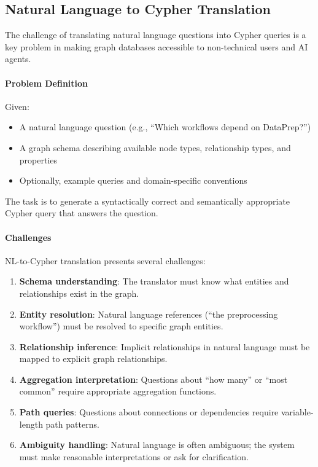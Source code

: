 \subsection{Natural Language to Cypher Translation}

The challenge of translating natural language questions into Cypher queries is a key problem in making graph databases accessible to non-technical users and AI agents.

\paragraph{Problem Definition}

Given:
\begin{itemize}
    \item A natural language question (e.g., ``Which workflows depend on DataPrep?'')
    \item A graph schema describing available node types, relationship types, and properties
    \item Optionally, example queries and domain-specific conventions
\end{itemize}

The task is to generate a syntactically correct and semantically appropriate Cypher query that answers the question.

\paragraph{Challenges}

NL-to-Cypher translation presents several challenges:

\begin{enumerate}
    \item \textbf{Schema understanding}: The translator must know what entities and relationships exist in the graph.
    
    \item \textbf{Entity resolution}: Natural language references (``the preprocessing workflow'') must be resolved to specific graph entities.
    
    \item \textbf{Relationship inference}: Implicit relationships in natural language must be mapped to explicit graph relationships.
    
    \item \textbf{Aggregation interpretation}: Questions about ``how many'' or ``most common'' require appropriate aggregation functions.
    
    \item \textbf{Path queries}: Questions about connections or dependencies require variable-length path patterns.
    
    \item \textbf{Ambiguity handling}: Natural language is often ambiguous; the system must make reasonable interpretations or ask for clarification.
\end{enumerate}

